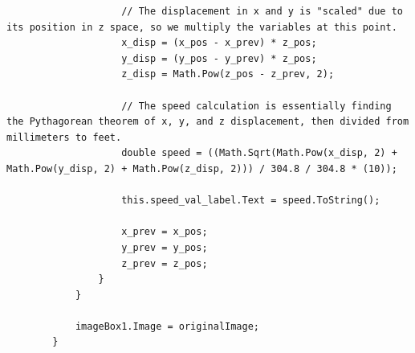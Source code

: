 \documentclass[onecolumn, draftclsnofoot,10pt, compsoc]{IEEEtran}
\begin{document}
\begin{lstlisting}
                    // The displacement in x and y is "scaled" due to its position in z space, so we multiply the variables at this point.
                    x_disp = (x_pos - x_prev) * z_pos;
                    y_disp = (y_pos - y_prev) * z_pos;
                    z_disp = Math.Pow(z_pos - z_prev, 2);
                    
                    // The speed calculation is essentially finding the Pythagorean theorem of x, y, and z displacement, then divided from millimeters to feet.
                    double speed = ((Math.Sqrt(Math.Pow(x_disp, 2) + Math.Pow(y_disp, 2) + Math.Pow(z_disp, 2))) / 304.8 / 304.8 * (10));

                    this.speed_val_label.Text = speed.ToString();

                    x_prev = x_pos;
                    y_prev = y_pos;
                    z_prev = z_pos;
                }
            }

            imageBox1.Image = originalImage;
        }
\end{lstlisting}
\end{document}
